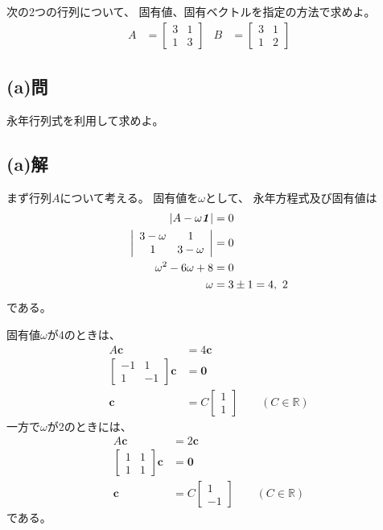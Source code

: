 次の2つの行列について、
固有値、固有ベクトルを指定の方法で求めよ。
\begin{align}
	A
&=
	\left[
	\begin{array}{cc}
		3 & 1 \\
		1 & 3
	\end{array}
	\right] &
%
%
	B
&=
	\left[
	\begin{array}{cc}
		3 & 1 \\
		1 & 2
	\end{array}
	\right]
\end{align}

\subsection{(a)問}
永年行列式を利用して求めよ。

\subsection{(a)解}
まず行列$A$について考える。
固有値を$\omega$として、
永年方程式及び固有値は
\begin{align}
	|A-\omega\identity|
&=
	0 \\
%
%
	\left|
	\begin{array}{cc}
		3-\omega & 1 \\
		1 & 3-\omega
	\end{array}
	\right|
&=
	0 \\
%
%
	\omega^2
	-
	6\omega
	+
	8
&=
	0 \\
%
%
	\omega
&=
	3
	\pm
	1
=
	4,\ 2
\end{align}
である。

固有値$\omega$が4のときは、
\begin{align}
	A\bm{c}
&=
	4\bm{c} \\
%
%
	\left[
	\begin{array}{cc}
		-1 & 1 \\
		1 & -1
	\end{array}
	\right] \bm{c}
&=
	\bm{0} \\
%
%
	\bm{c}
&=
	C
		\left[
		\begin{array}{c}
			1 \\ 1
		\end{array}
		\right]
	\qquad
	(C\in\mathbb{R})
\end{align}
一方で$\omega$が2のときには、
\begin{align}
	A\bm{c}
&=
	2\bm{c} \\
%
%
	\left[
	\begin{array}{cc}
		1 & 1 \\
		1 & 1
	\end{array}
	\right] \bm{c}
&=
	\bm{0} \\
%
%
	\bm{c}
&=
	C
		\left[
		\begin{array}{c}
			1 \\ -1
		\end{array}
		\right]
	\qquad
	(C\in\mathbb{R})
\end{align}
である。

